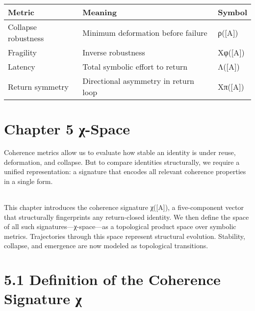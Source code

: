 \begin{longtable}[]{@{}
  >{\raggedright\arraybackslash}p{}
  >{\raggedright\arraybackslash}p{}
  >{\raggedright\arraybackslash}p{}@{}}
\toprule\noalign{}
\begin{minipage}[b]{\linewidth}\raggedright
Metric
\end{minipage} & \begin{minipage}[b]{\linewidth}\raggedright
Meaning
\end{minipage} & \begin{minipage}[b]{\linewidth}\raggedright
Symbol
\end{minipage} \\
\midrule\noalign{}
\endhead
\bottomrule\noalign{}
\endlastfoot
Collapse robustness & Minimum deformation before failure & ρ({[}A{]}) \\
Fragility & Inverse robustness & Xφ({[}A{]}) \\
Latency & Total symbolic effort to return & Λ({[}A{]}) \\
Return symmetry & Directional asymmetry in return loop & Xπ({[}A{]}) \\
\end{longtable}

\section{Chapter 5 \textbar{} χ-Space}\label{chapter-5-ux3c7-space}

Coherence metrics allow us to evaluate how stable an identity is under
reuse, deformation, and collapse. But to compare identities
structurally, we require a unified representation: a signature that
encodes all relevant coherence properties in a single form.\\
\strut \\
This chapter introduces the coherence signature χ({[}A{]}), a
five-component vector that structurally fingerprints any return-closed
identity. We then define the space of all such signatures---χ-space---as
a topological product space over symbolic metrics. Trajectories through
this space represent structural evolution. Stability, collapse, and
emergence are now modeled as topological transitions.

\section{5.1 \textbar{} Definition of the Coherence Signature
χ}\label{definition-of-the-coherence-signature-ux3c7}

